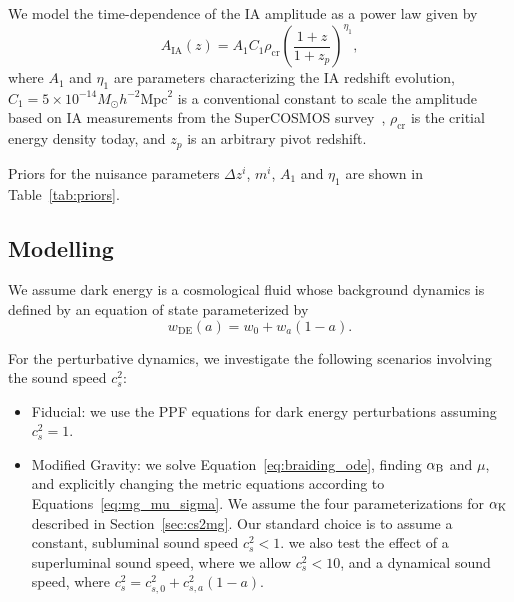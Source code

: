 \documentclass[%
reprint,
superscriptaddress,
preprint numbers,
nofootinbib,
amsmath,amssymb,
aps,
prd
]{revtex4-2}
\begin{document}
\begin{itemize}
    We model the time-dependence of the IA amplitude as a power law given by
    \begin{equation}
        A_\mathrm{IA}(z) = A_1C_1\rho_\mathrm{cr}\left(\frac{1 + z}{1 + z_p}\right)^{\eta_1},
    \end{equation}
    where $A_1$ and $\eta_1$ are parameters characterizing the IA redshift evolution, $C_1 = 5 \times 10^{-14} M_\odot h^{-2} \mathrm{Mpc}^2$ is a conventional constant to scale the amplitude based on IA measurements from the SuperCOSMOS survey~\cite{measuring_ia}, $\rho_\mathrm{cr}$ is the critial energy density today, and $z_p$ is an arbitrary pivot redshift.
\end{itemize}

Priors for the nuisance parameters $\Delta z^i$, $m^i$, $A_1$ and $\eta_1$ are shown in Table~\ref{tab:priors}.

\subsection{Modelling}

We assume dark energy is a cosmological fluid whose background dynamics is defined by an equation of state parameterized by
\begin{equation}
    w_\mathrm{DE}(a) = w_0 + w_a(1-a).
\end{equation}

For the perturbative dynamics, we investigate the following scenarios involving the sound speed $c_s^2$:
\begin{itemize}
    \item Fiducial: we use the PPF equations for dark energy perturbations assuming $c_s^2 = 1$.
    \item Modified Gravity: we solve Equation~\ref{eq:braiding_ode}, finding $\alpha_{\rm B}$ and $\mu$, and explicitly changing the metric equations according to Equations~\ref{eq:mg_mu_sigma}.  We assume the four parameterizations for $\alpha_{\rm K}$ described in Section~\ref{sec:cs2mg}. Our standard choice is to assume a constant, subluminal sound speed $c_s^2 < 1$.  we also test the effect of a superluminal sound speed, where we allow $c_s^2 < 10$, and a dynamical sound speed, where $c_s^2 = c_{s,0}^2 + c_{s,a}^2(1-a)$.
\end{itemize}
\end{document}
